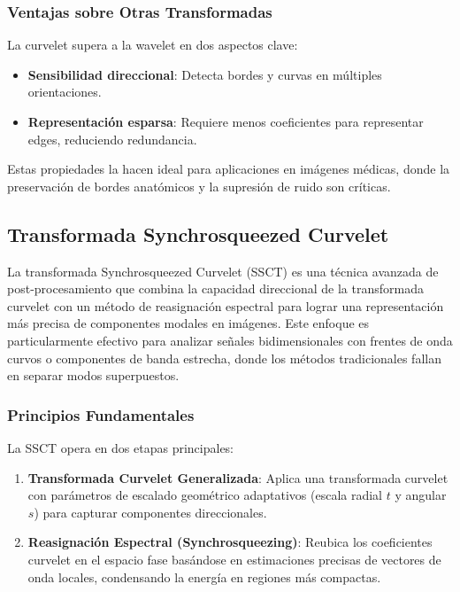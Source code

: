 \subsubsection{Ventajas sobre Otras Transformadas}

La curvelet supera a la wavelet en dos aspectos clave:
\begin{itemize}
    \item \textbf{Sensibilidad direccional}: Detecta bordes y curvas en múltiples orientaciones.
    \item \textbf{Representación esparsa}: Requiere menos coeficientes para representar edges, reduciendo redundancia.
\end{itemize}

Estas propiedades la hacen ideal para aplicaciones en imágenes médicas, donde la preservación de bordes anatómicos y la supresión de ruido son críticas.

\subsection{Transformada Synchrosqueezed Curvelet}

La transformada Synchrosqueezed Curvelet (SSCT) es una técnica avanzada de post-procesamiento que combina la capacidad direccional de la transformada curvelet con un método de reasignación espectral para lograr una representación más precisa de componentes modales en imágenes. Este enfoque es particularmente efectivo para analizar señales bidimensionales con frentes de onda curvos o componentes de banda estrecha, donde los métodos tradicionales fallan en separar modos superpuestos\cite{SynchrosqueezedCurveletTransform}.

\subsubsection{Principios Fundamentales}

La SSCT opera en dos etapas principales:
\begin{enumerate}
    \item \textbf{Transformada Curvelet Generalizada}: Aplica una transformada curvelet con parámetros de escalado geométrico adaptativos (escala radial \(t\) y angular \(s\)) para capturar componentes direccionales.
    \item \textbf{Reasignación Espectral (Synchrosqueezing)}: Reubica los coeficientes curvelet en el espacio fase basándose en estimaciones precisas de vectores de onda locales, condensando la energía en regiones más compactas.
\end{enumerate}

